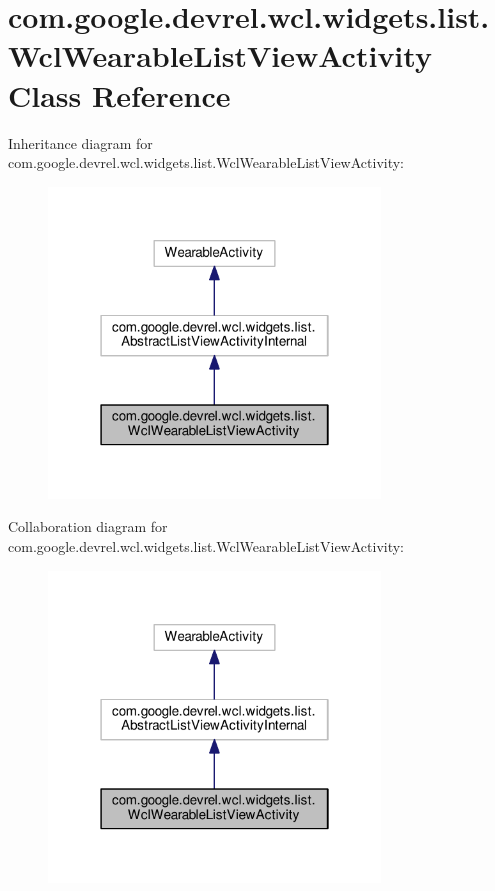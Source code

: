 \hypertarget{classcom_1_1google_1_1devrel_1_1wcl_1_1widgets_1_1list_1_1WclWearableListViewActivity}{}\section{com.\+google.\+devrel.\+wcl.\+widgets.\+list.\+Wcl\+Wearable\+List\+View\+Activity Class Reference}
\label{classcom_1_1google_1_1devrel_1_1wcl_1_1widgets_1_1list_1_1WclWearableListViewActivity}


Inheritance diagram for com.\+google.\+devrel.\+wcl.\+widgets.\+list.\+Wcl\+Wearable\+List\+View\+Activity\+:
\nopagebreak
\begin{figure}[H]
\begin{center}
\leavevmode
\includegraphics[width=250pt]{d2/da7/classcom_1_1google_1_1devrel_1_1wcl_1_1widgets_1_1list_1_1WclWearableListViewActivity__inherit__graph}
\end{center}
\end{figure}


Collaboration diagram for com.\+google.\+devrel.\+wcl.\+widgets.\+list.\+Wcl\+Wearable\+List\+View\+Activity\+:
\nopagebreak
\begin{figure}[H]
\begin{center}
\leavevmode
\includegraphics[width=250pt]{d5/d9a/classcom_1_1google_1_1devrel_1_1wcl_1_1widgets_1_1list_1_1WclWearableListViewActivity__coll__graph}
\end{center}
\end{figure}
